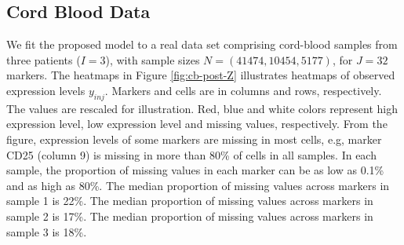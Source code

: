 \documentclass[12pt,]{article}
\begin{document}
\subsection{Cord Blood Data}
We fit the proposed model to a real data set comprising cord-blood samples from
three patients ($I=3$), with sample sizes $N=(41474, 10454, 5177)$, for $J=32$
markers. The heatmaps in Figure \ref{fig:cb-post-Z} illustrates heatmaps of
observed expression levels $y_{inj}$.  Markers and cells are in columns and
rows, respectively. The values are rescaled for illustration.  Red, blue and
white colors represent high expression level, low expression level and missing
values, respectively.  From the figure, expression levels of some markers are
missing in most cells, e.g, marker CD25 (column 9) is missing in more than 80\%
of cells in all samples.
%
In each sample, the proportion of missing values in each marker can be as low
as 0.1\% and as high as 80\%.  
The median proportion of missing values across markers in sample 1 is 22\%.
The median proportion of missing values across markers in sample 2 is 17\%.
The median proportion of missing values across markers in sample 3 is 18\%.
\end{document}
